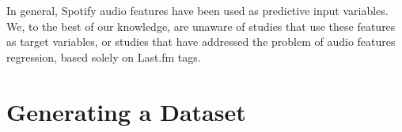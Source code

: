 \documentclass[sn-mathphys]{sn-jnl}%
\theoremstyle{thmstyleone}%
\theoremstyle{thmstyletwo}%
\theoremstyle{thmstylethree}%
\begin{document}

In general, Spotify audio features have been used as predictive input variables.
We, to the best of our knowledge, are unaware of studies that use these features as target variables,
or studies that have addressed the problem of audio features regression, based solely on Last.fm tags.







%

\section{Generating a Dataset}
\end{document}
